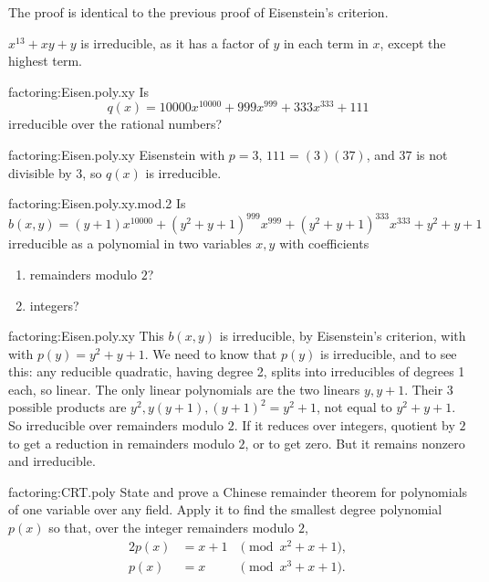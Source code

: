 The proof is identical to the previous proof of Eisenstein's criterion.
\begin{example}
\(x^{13}+xy+y\) is irreducible, as it has a factor of \(y\) in each term in \(x\), except the highest term.
\end{example}
\begin{problem}{factoring:Eisen.poly.xy}
Is
\[
q(x)=10000x^{10000}+999x^{999}+333x^{333}+111
\]
irreducible over the rational numbers?
\end{problem}
\begin{answer}{factoring:Eisen.poly.xy}
Eisenstein with \(p=3\), \(111=(3)(37)\), and \(37\) is not divisible by 3, so \(q(x)\) is irreducible.
\end{answer}
\begin{problem}{factoring:Eisen.poly.xy.mod.2}
Is
\[
b(x,y)=(y+1)x^{10000}+(y^2+y+1)^{999}x^{999}+(y^2+y+1)^{333}x^{333}+y^2+y+1
\]
irreducible as a polynomial in two variables \(x,y\) with coefficients 
\begin{enumerate}
\item remainders modulo \(2\)?  
\item integers?
\end{enumerate}
\end{problem}
\begin{answer}{factoring:Eisen.poly.xy}
This \(b(x,y)\) is irreducible, by Eisenstein's criterion, with with \(p(y)=y^2+y+1\).
We need to know that \(p(y)\) is irreducible, and to see this: any reducible quadratic, having degree 2, splits into irreducibles of degrees 1 each, so linear.
The only linear polynomials are the two linears \(y,y+1\).
Their 3 possible products are \(y^2,y(y+1),(y+1)^2=y^2+1\), not equal to \(y^2+y+1\).
So irreducible over remainders modulo \(2\).
If it reduces over integers, quotient by \(2\) to get a reduction in remainders modulo \(2\), or to get zero.
But it remains nonzero and irreducible.
\end{answer}
\begin{problem}{factoring:CRT.poly}
State and prove a Chinese remainder theorem for polynomials of one variable over any field.
Apply it to find the smallest degree polynomial \(p(x)\) so that, over the integer remainders modulo \(2\),
\begin{alignat*}{2}
p(x) &= x+1 &\pmod{x^2+x+1}, \\
p(x) &= x   &\pmod{x^3+x+1}.
\end{alignat*}
\end{problem}
